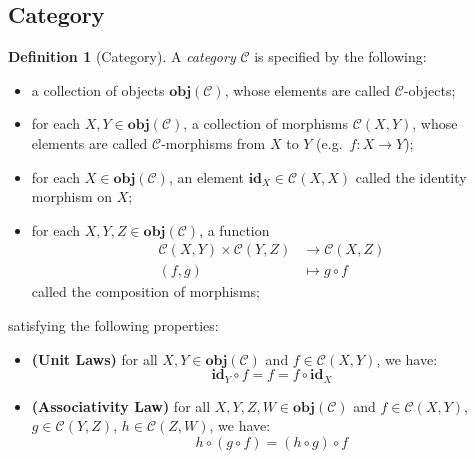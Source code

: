 \documentclass[12pt,twoside,a4paper]{report}
\theoremstyle{definition}
\newtheorem*{definition*}{Definition}
\theoremstyle{definition}
\begin{document}
        \subsection{Category}
        \begin{definition*}[Category]
            A \emph{category} $\mathcal{C}$ is specified by the following:
            \begin{itemize}
                \item 
                    a collection of objects $\textbf{obj}(\mathcal{C})$, whose elements are called $\mathcal{C}$-objects;
                \item 
                    for each $X, Y \in \textbf{obj}(\mathcal{C})$, a collection of morphisms $\mathcal{C}{(X,Y)}$, whose elements are called $\mathcal{C}$-morphisms from $X$ to $Y$ (e.g.\ $f : X \to Y$);
                \item 
                    for each $X \in \textbf{obj}(\mathcal{C})$, an element $\textbf{id}_X \in \mathcal{C}{(X,X)}$ called the identity morphism on $X$;
                \item 
                    for each $X, Y, Z \in \textbf{obj}(\mathcal{C})$, a function 
                    \[\begin{aligned}
                        \mathcal{C}{(X,Y)} \times \mathcal{C}{(Y,Z)} &\to \mathcal{C}{(X,Z)} \\
                        (f,g) &\mapsto g \circ f
                    \end{aligned}\]
                    called the composition of morphisms;
            \end{itemize}
            satisfying the following properties:
            \begin{itemize}
                \item 
                    \textbf{(Unit Laws)}
                    for all $X, Y \in \textbf{obj}(\mathcal{C})$ and $f \in \mathcal{C}{(X,Y)}$, we have:
                    \begin{equation} \label{law: unit}
                        \textbf{id}_Y \circ f = f = f \circ \textbf{id}_X
                    \end{equation}
                \item
                    \textbf{(Associativity Law)}
                    for all $X, Y, Z, W \in \textbf{obj}(\mathcal{C})$ and $f \in \mathcal{C}{(X,Y)}$, $g \in \mathcal{C}{(Y,Z)}$, $h \in \mathcal{C}{(Z,W)}$, we have:
                    \begin{equation} \label{law: associativity}
                        h \circ (g \circ f) = (h \circ g) \circ f
                    \end{equation}
            \end{itemize}
        \end{definition*}
\end{document}
